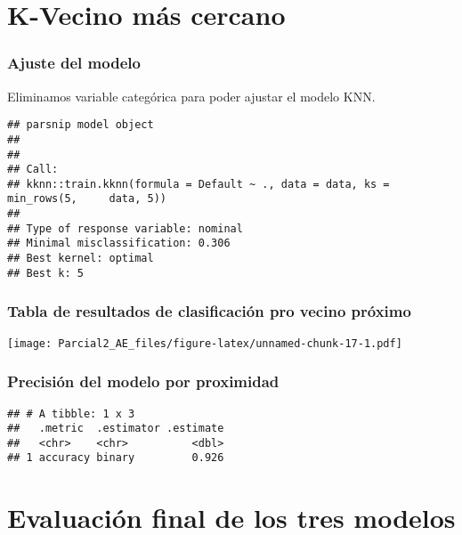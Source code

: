 \documentclass[
]{article}
\begin{document}
\hypertarget{k-vecino-muxe1s-cercano}{%
\section{K-Vecino más cercano}\label{k-vecino-muxe1s-cercano}}

\hypertarget{ajuste-del-modelo-1}{%
\subsubsection{Ajuste del modelo}\label{ajuste-del-modelo-1}}

Eliminamos variable categórica para poder ajustar el modelo KNN.

\begin{verbatim}
## parsnip model object
## 
## 
## Call:
## kknn::train.kknn(formula = Default ~ ., data = data, ks = min_rows(5,     data, 5))
## 
## Type of response variable: nominal
## Minimal misclassification: 0.306
## Best kernel: optimal
## Best k: 5
\end{verbatim}

\hypertarget{tabla-de-resultados-de-clasificaciuxf3n-pro-vecino-pruxf3ximo}{%
\subsubsection{Tabla de resultados de clasificación pro vecino
próximo}\label{tabla-de-resultados-de-clasificaciuxf3n-pro-vecino-pruxf3ximo}}

\texttt{[image: Parcial2\_AE\_files/figure-latex/unnamed-chunk-17-1.pdf]}

\hypertarget{precisiuxf3n-del-modelo-por-proximidad}{%
\subsubsection{Precisión del modelo por
proximidad}\label{precisiuxf3n-del-modelo-por-proximidad}}

\begin{verbatim}
## # A tibble: 1 x 3
##   .metric  .estimator .estimate
##   <chr>    <chr>          <dbl>
## 1 accuracy binary         0.926
\end{verbatim}

\hypertarget{evaluaciuxf3n-final-de-los-tres-modelos}{%
\section{Evaluación final de los tres
modelos}\label{evaluaciuxf3n-final-de-los-tres-modelos}}
\end{document}
